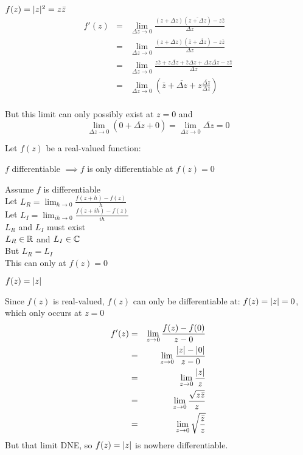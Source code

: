 \documentclass[letterpaper,12pt,fleqn]{article}
\newcommand{\D}{\Delta}
\newcommand{\limzz}{\lim_{z\to 0}}
\newcommand{\limdz}{\lim_{\D z\to0}}
\begin{document}
\begin{example}
  $f(z)=\lvert z\rvert^2=z\bar{z}$
  \begin{eqnarray*}
    f'(z) &=& \limdz{\frac{(z+\D z)(\overline{z+\D z})-z\bar{z}}{\D z}} \\
    &=& \limdz{\frac{(z+\D z)(\bar{z}+\overline{\D z})-z\bar{z}}{\D z}} \\
    &=& \limdz{\frac{z\bar{z}+z\overline{\D z}+ \bar{z}\D z+
        \D z\overline{\D z}-z\bar{z}}{\D z}} \\
    &=& \limdz{\left(\bar{z}+\overline{\D z}+z\frac{\overline{\D z}}{\D z}
    \right)} \\
  \end{eqnarray*}

  But this limit can only possibly exist at $z=0$ and
  \[\limdz{\left(0+\overline{\D z}+0\right)}=\limdz{\overline{\D z}}=0\]
\end{example}

\begin{theorem}
  Let $f(z)$ be a real-valued function:

  $f$ differentiable $\implies f$ is only differentiable at $f(z)=0$
\end{theorem}

\begin{theproof}
  Assume $f$ is differentiable \\
  Let $L_R=\lim_{h\to 0}\frac{f(z+h)-f(z)}{h}$ \\
  Let $L_I=\lim_{ih\to 0}\frac{f(z+ih)-f(z)}{ih}$ \\
  $L_R$ and $L_I$ must exist \\
  $L_R\in\mathbb{R}$ and $L_I\in\mathbb{C}$ \\
  But $L_R=L_I$ \\
  This can only at $f(z)=0$
\end{theproof}
\newpage
\begin{example}
  $f(z)=\lvert z\rvert$

  Since $f(z)$ is real-valued, $f(z)$ can only be differentiable at:
  $f(z)=\lvert z\rvert=0$, which only occurs at $z=0$
  \begin{eqnarray*}
    f'(z) &=& \limzz{\frac{f(z)-f(0)}{z-0}} \\
    &=& \limzz{\frac{\abs{z}-\abs{0}}{z-0}} \\
    &=& \limzz{\frac{\abs{z}}{z}} \\
    &=& \limzz{\frac{\sqrt{z\bar{z}}}{z}} \\
    &=& \limzz{\sqrt{\frac{\bar{z}}{z}}} \\
  \end{eqnarray*}
  But that limit DNE, so $f(z)=\lvert z\rvert$ is nowhere differentiable.
\end{example}
\end{document}
